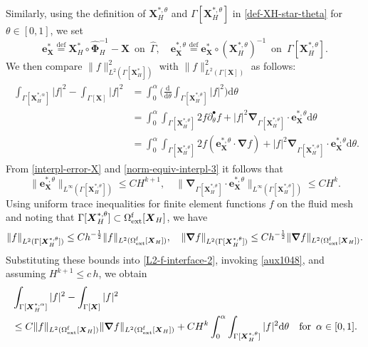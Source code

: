 \documentclass[11pt,reqno]{amsart}
\theoremstyle{definition}
\theoremstyle{plain}
\numberwithin{theorem}{section}
\numberwithin{proposition}{section}
\numberwithin{lemma}{section}
\numberwithin{equation}{section}
\newcommand{\bs}[1]{\boldsymbol{#1}}
\newcommand{\uu}[1]  {{\bs{#1}} }
\newcommand{\grad}   { \uu{\nabla}    }
\def\d{\mathrm{d}}
\renewcommand{\(}{\bigl(}
\renewcommand{\)}{\bigr)}
\def\eqd{\stackrel{\mathrm{def}}{=}}
\begin{document}
Similarly, using the definition of 
$
{\bs X}_H^{*,\theta} 
$
and $\Gamma[{\bs X}_H^{*,\theta}]$
in \eqref{def-XH-star-theta} for $\theta\in [0,1]$, we set 
\begin{equation}\label{def-eXs}
{\bs e}_{\bs X}^*\eqd {\bs X}_H^*\circ \widehat{\bs\Phi}_H^{-1} - {\bs X} \,\,\,\mbox{on}\,\,\, \widehat\Gamma, 
\quad
{\bs e}_{\bs X}^{*,\theta}\eqd{\bs e}_{\bs X}^*\circ ({\bs X}_H^{*,\theta})^{-1} \,\,\,\mbox{on}\,\,\, \Gamma[{\bs X}_H^{*,\theta}] . 
\end{equation}
We then compare $\|f\|_{L^2(\Gamma[\bs X_H^*])}^2$ with $\|f\|_{L^2(\Gamma[\bs X])}^2$ as follows:
\begin{align}\label{L2-f-interface-2}
\begin{aligned}
\int_{\Gamma[\bs X_H^{*,\alpha}]} | f |^2 - \int_{\Gamma[\bs X]} | f |^2 
&= \int_0^\alpha \Big( \frac{\d}{\d\theta}\int_{\Gamma[{\bs X}_H^{*,\theta}]} | f |^2\Big) \d\theta \\
&= \int_0^\alpha \int_{\Gamma[\bs X_H^{*,\theta}]} 2f \partial_\theta^\bullet f + |f|^2\grad_{\Gamma[\bs X_H^{*,\theta}]}\cdot {\bs e}_{\bs X}^{*,\theta} \d\theta \\
&= \int_0^\alpha \int_{\Gamma[\bs X_H^{*,\theta}]} 2f ({\bs e}_{\bs X}^{*,\theta}\cdot \grad f) + |f|^2\grad_{\Gamma[\bs X_H^{*,\theta}]}\cdot {\bs e}_{\bs X}^{*,\theta} \d\theta .
\end{aligned}
\end{align}
From \eqref{interpl-error-X} and \eqref{norm-equiv-interpl-3} it follows that
\begin{equation}\label{aux1048}
\|{\bs e}_{\bs X}^{*,\theta}\|_{L^{\infty}(\Gamma[\bs X_H^{*,\theta}])} \le CH^{k+1} , \quad 
\|\grad_{\Gamma[\bs X_H^{*,\theta}]}\cdot {\bs e}_{\bs X}^{*,\theta}\|_{L^\infty(\Gamma[\bs X_H^{*,\theta}])}\le CH^k .
\end{equation}
Using uniform trace inequalities for finite element functions $f$ on the fluid mesh and noting that $\Gamma[{\bs X}_H^{*,\theta}] \subset \Omega^{\rm f}_{\rm ext}[{\bs X}_H]$, we have
$$
\|f\|_{L^2(\Gamma[\bs X_H^{*,\theta}])} \le Ch^{-\frac12}\|f\|_{L^2(\Omega^{\rm f}_{\rm ext}[\bs X_H])},
\quad
\|\grad f\|_{L^2(\Gamma[\bs X_H^{*,\theta}])} \le Ch^{-\frac12}\|\grad f\|_{L^2(\Omega^{\rm f}_{\rm ext}[\bs X_H])}.
$$ 
Substituting these bounds into \eqref{L2-f-interface-2}, invoking \eqref{aux1048}, and assuming $H^{k+1}\le c\,h$, we obtain
\begin{align}\label{L2-f-trace-err}
\begin{aligned}
&\int_{\Gamma[\bs X_H^{*,\alpha}]} | f |^2 - \int_{\Gamma[\bs X]} | f |^2\\
&\le C \|f\|_{L^2(\Omega^{\rm f}_{\rm ext}[\bs X_H])} \|\grad f\|_{L^2(\Omega^{\rm f}_{\rm ext}[\bs X_H])} 
+ CH^k\int_0^\alpha\int_{\Gamma[\bs X_H^{*,\theta}]} | f |^2 \d\theta 
\quad\mbox{for}\,\,\,\alpha\in[0,1].
\end{aligned}
\end{align}
\end{document}
